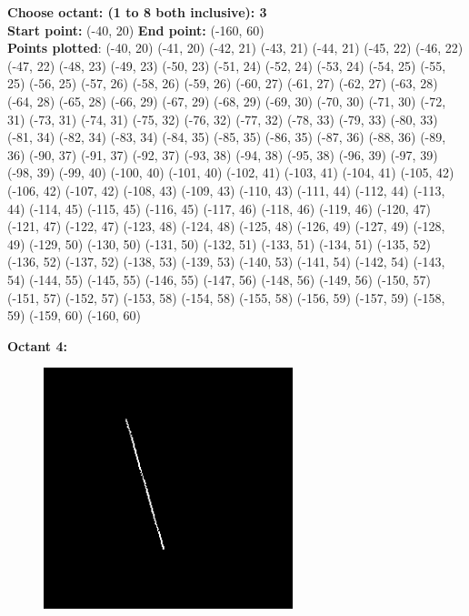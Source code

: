 \documentclass[12pt,letterpaper]{article}
\begin{document}
\textbf{Choose octant: (1 to 8 both inclusive): 3}\\
\textbf{Start point:} (-40, 20)
\textbf{End point:} (-160, 60)\\
\textbf{Points plotted}:
(-40, 20) (-41, 20) (-42, 21) (-43, 21) 
(-44, 21) (-45, 22) (-46, 22) (-47, 22) 
(-48, 23) (-49, 23) (-50, 23) (-51, 24) 
(-52, 24) (-53, 24) (-54, 25) (-55, 25) 
(-56, 25) (-57, 26) (-58, 26) (-59, 26) 
(-60, 27) (-61, 27) (-62, 27) (-63, 28) 
(-64, 28) (-65, 28) (-66, 29) (-67, 29) 
(-68, 29) (-69, 30) (-70, 30) (-71, 30) 
(-72, 31) (-73, 31) (-74, 31) (-75, 32) 
(-76, 32) (-77, 32) (-78, 33) (-79, 33) 
(-80, 33) (-81, 34) (-82, 34) (-83, 34) 
(-84, 35) (-85, 35) (-86, 35) (-87, 36) 
(-88, 36) (-89, 36) (-90, 37) (-91, 37) 
(-92, 37) (-93, 38) (-94, 38) (-95, 38) 
(-96, 39) (-97, 39) (-98, 39) (-99, 40) 
(-100, 40) (-101, 40) (-102, 41) (-103, 41) 
(-104, 41) (-105, 42) (-106, 42) (-107, 42) 
(-108, 43) (-109, 43) (-110, 43) (-111, 44) 
(-112, 44) (-113, 44) (-114, 45) (-115, 45) 
(-116, 45) (-117, 46) (-118, 46) (-119, 46) 
(-120, 47) (-121, 47) (-122, 47) (-123, 48) 
(-124, 48) (-125, 48) (-126, 49) (-127, 49) 
(-128, 49) (-129, 50) (-130, 50) (-131, 50) 
(-132, 51) (-133, 51) (-134, 51) (-135, 52) 
(-136, 52) (-137, 52) (-138, 53) (-139, 53) 
(-140, 53) (-141, 54) (-142, 54) (-143, 54) 
(-144, 55) (-145, 55) (-146, 55) (-147, 56) 
(-148, 56) (-149, 56) (-150, 57) (-151, 57) 
(-152, 57) (-153, 58) (-154, 58) (-155, 58) 
(-156, 59) (-157, 59) (-158, 59) (-159, 60) 
(-160, 60)


\newpage
\textbf{Octant 4:}
\begin{figure}[h]
    \centering
    \includegraphics[height=7cm]{Outputs/O4.png}
\end{figure}
\end{document}
